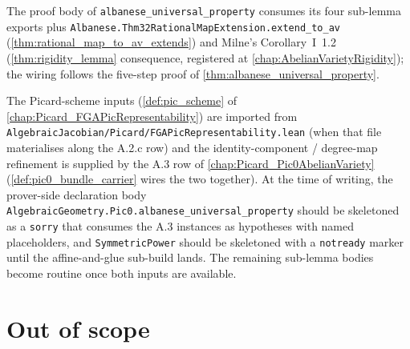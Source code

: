 The proof body of \texttt{albanese\_universal\_property} consumes its four
sub-lemma exports plus \texttt{Albanese.Thm32RationalMapExtension.extend\_to\_av}
(\cref{thm:rational_map_to_av_extends}) and Milne's Corollary~I~1.2
(\cref{thm:rigidity_lemma} consequence, registered at
\cref{chap:AbelianVarietyRigidity}); the wiring follows the five-step proof
of \cref{thm:albanese_universal_property}.

The Picard-scheme inputs (\cref{def:pic_scheme} of
\cref{chap:Picard_FGAPicRepresentability}) are imported from
\texttt{AlgebraicJacobian/Picard/FGAPicRepresentability.lean} (when that file
materialises along the A.2.c row) and the identity-component / degree-map
refinement is supplied by the A.3 row of
\cref{chap:Picard_Pic0AbelianVariety} (\cref{def:pic0_bundle_carrier}
wires the two together). At the time of writing, the
prover-side declaration body
\texttt{AlgebraicGeometry.Pic0.albane\-se\_universal\_property} should be
skeletoned as a \texttt{sorry} that consumes the A.3 instances as
hypotheses with named placeholders, and \texttt{Sym\-met\-ric\-Power} should
be skeletoned with a \texttt{notready} marker until the affine-and-glue
sub-build lands. The remaining sub-lemma bodies become routine once both
inputs are available.

\section{Out of scope}
\label{sec:albaneseup_out_of_scope}

